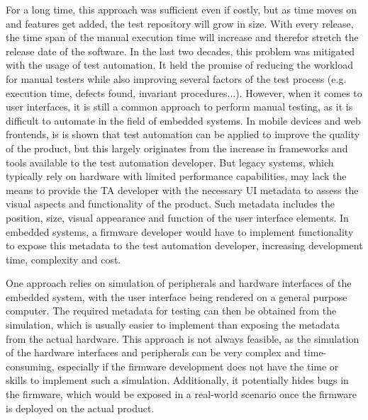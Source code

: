 \documentclass[Proposal,BIC,english,fhCitStyle,IEEE]{BASE/twbook} %
\begin{document}
For a long time, this approach was sufficient even if costly, but as time moves on and features get added, the test repository will grow in size. With every release, the time span of the manual execution time will increase and therefor stretch the release date of the software.
In the last two decades, this problem was mitigated with the usage of test automation. It held the promise of reducing the workload for manual testers while also improving several factors of the test process (e.g. execution time, defects found, invariant procedures...).
However, when it comes to user interfaces, it is still a common approach to perform manual testing, as it is difficult to automate in the field of embedded systems.
In mobile devices and web frontends, is is shown that test automation can be applied to improve the quality of the product, but this largely originates from the increase in frameworks and tools available to the test automation developer.
But legacy systems, which typically rely on hardware with limited performance capabilities, may lack the means to provide the TA developer with the necessary UI metadata to assess the visual aspects and functionality of the product. Such metadata includes the position, size, visual appearance and function of the user interface elements. In embedded systems, a firmware developer would have to implement functionality to expose this metadata to the test automation developer, increasing development time, complexity and cost.

One approach \cite[]{approachA} relies on simulation of peripherals and hardware interfaces of the embedded system, with the user interface being rendered on a general purpose computer. The required metadata for testing can then be obtained from the simulation, which is usually easier to implement than exposing the metadata from the actual hardware.
This approach is not always feasible, as the simulation of the hardware interfaces and peripherals can be very complex and time-consuming, especially if the firmware development does not have the time or skills to implement such a simulation. Additionally, it potentially hides bugs in the firmware, which would be exposed in a real-world scenario once the firmware is deployed on the actual product.
\end{document}
